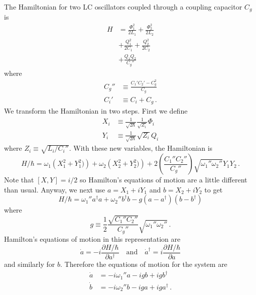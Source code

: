 The Hamiltonian for two LC oscillators coupled through a coupling capacitor $C_g$ is
\begin{align}
  H
  &= \frac{\Phi_1^2}{2 L_1} + \frac{\Phi_2^2}{2 L_2} \\
  &+ \frac{Q_1^2}{2 C_1} + \frac{Q_2^2}{2 C_2} \\
  &+ \frac{Q_1 Q_2}{C_g''}
\end{align}
where
\begin{align}
  C_g'' &\equiv \frac{C_1' C_2' - C_g^2}{C_g} \\
  C_i' &\equiv C_i + C_g \, .
\end{align}
We transform the Hamiltonian in two steps.
First we define
\begin{align*}
  X_i &\equiv \frac{1}{\sqrt{2 \hbar}} \frac{1}{\sqrt{Z_i}} \Phi_i \\
  Y_i &\equiv \frac{1}{\sqrt{2 \hbar}} \sqrt{Z_i} Q_i
\end{align*}
where $Z_i \equiv \sqrt{L_i / C_i''}$.
With these new variables, the Hamiltonian is
\begin{equation}
  H/\hbar =
    \omega_1 \left(X_1^2 + Y_1^2) \right)
  + \omega_2 \left(X_2^2 + Y_2^2) \right)
  + 2 \left( \frac{C_1'' C_2''}{C_g''} \right) \sqrt{\omega_1'' \omega_2''} Y_1 Y_2 \, .
\end{equation}
Note that $[X, Y] = i/2$ so Hamilton's equations of motion are a little different than usual.
Anyway, we next use $a = X_1 + i Y_1$ and $b = X_2 + i Y_2$ to get
\begin{equation}
  H / \hbar =
    \omega_1'' a^\dagger a
  + \omega_2'' b^\dagger b
  - g (a - a^\dagger) (b - b^\dagger)
\end{equation}
where
\begin{equation}
  g \equiv \frac{1}{2} \frac{\sqrt{C_1'' C_2''}}{C_g''} \sqrt{\omega_1'' \omega_2''} \, .
\end{equation}
Hamilton's equations of motion in this representation are
\begin{equation*}
  \dot{a} = -i \frac{\partial H/\hbar}{\partial a^\dagger}
  \quad \text{and} \quad
  \dot{a}^\dagger = i \frac{\partial H/\hbar}{\partial a}
\end{equation*}
and similarly for $b$.
Therefore the equations of motion for the system are
\begin{align*}
  \dot a &= -i \omega_1'' a -i g b + i g b^\dagger \\
  \dot b &= -i \omega_2'' b -i g a + i g a^\dagger \, .
\end{align*}
